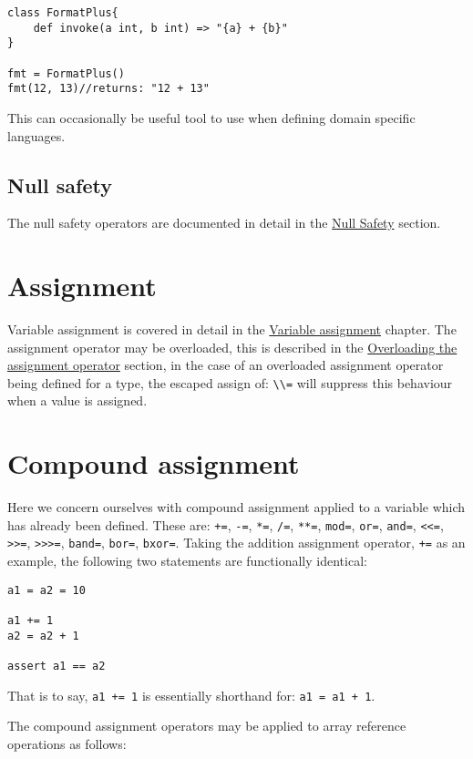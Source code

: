 \documentclass[conc-doc]{subfiles}
\begin{document}
\begin{lstlisting}
class FormatPlus{
	def invoke(a int, b int) => "{a} + {b}"
}

fmt = FormatPlus()
fmt(12, 13)//returns: "12 + 13"
\end{lstlisting}

This can occasionally be useful tool to use when defining domain specific languages.

\subsection{Null safety}
The null safety operators are documented in detail in the \hyperref[ch:nullsafe]{Null Safety} section.

\section{Assignment}
Variable assignment is covered in detail in the \hyperref[ch:assignment]{Variable assignment} chapter. The assignment operator may be overloaded, this is described in the \hyperref[subsec:overloadassignmentop]{Overloading the assignment operator} section, in the case of an overloaded assignment operator being defined for a type, the escaped assign of: \lstinline{\\=} will suppress this behaviour when a value is assigned.

\section{Compound assignment}
Here we concern ourselves with compound assignment applied to a variable which has already been defined. These are: \lstinline{+=}, \lstinline{-=}, \lstinline{*=}, \lstinline{/=}, \lstinline{**=}, \lstinline{mod=}, \lstinline{or=}, \lstinline{and=}, \lstinline{<<=}, \lstinline{>>=}, \lstinline{>>>=}, \lstinline{band=}, \lstinline{bor=}, \lstinline{bxor=}. Taking the addition assignment operator, \lstinline{+=} as an example, the following two statements are functionally identical:

\begin{lstlisting}
a1 = a2 = 10

a1 += 1
a2 = a2 + 1

assert a1 == a2
\end{lstlisting}

That is to say, \lstinline{a1 += 1} is essentially shorthand for: \lstinline{a1 = a1 + 1}.

The compound assignment operators may be applied to array reference operations as follows:
\end{document}
